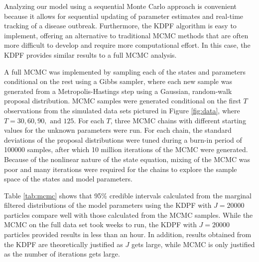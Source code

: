 \documentclass{elsarticle}
\newcommand{\danny}[1]{{\color{blue} DANNY: #1}}
\begin{document}
Analyzing our model using a sequential Monte Carlo approach is convenient because it allows for sequential updating of parameter estimates and real-time tracking of a disease outbreak. Furthermore, the KDPF algorithm is easy to implement, offering an alternative to traditional MCMC methods that are often more difficult to develop and require more computational effort. In this case, the KDPF provides similar results to a full MCMC analysis.

A full MCMC was implemented by sampling each of the states and parameters conditional on the rest using a Gibbs sampler, where each new sample was generated from a Metropolis-Hastings step using a Gaussian, random-walk proposal distribution. MCMC samples were generated conditional on the first $T$ observations from the simulated data sets pictured in Figure \ref{fig:data}, where $T = 30, 60, 90, \mbox{ and } 125$. For each $T$, three MCMC chains with different starting values for the unknown parameters were run. For each chain, the standard deviations of the proposal distributions were tuned during a burn-in period of 100000 samples, after which 10 million iterations of the MCMC were generated. Because of the nonlinear nature of the state equation, mixing of the MCMC was poor and many iterations were required for the chains to explore the sample space of the states and model parameters. %

Table \ref{tab:mcmc} shows that 95\% credible intervals calculated from the marginal filtered distributions of the model parameters using the KDPF with $J = 20000$ particles compare well with those calculated from the MCMC samples. While the MCMC on the full data set took weeks to run, the KDPF with $J = 20000$ particles provided results in less than an hour. In addition, results obtained from the KDPF are theoretically justified as $J$ gets large, while MCMC is only justified as the number of iterations gets large. %
\end{document}

